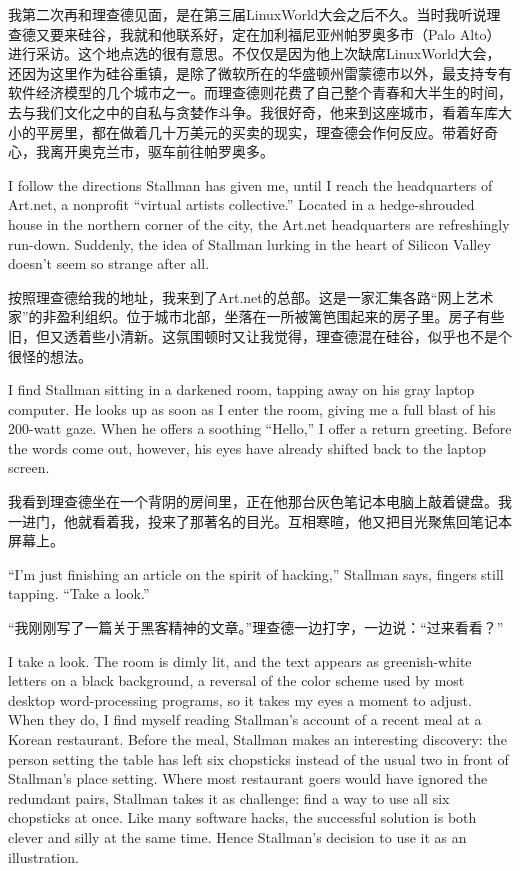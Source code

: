\ifdefined\chs
我第二次再和理查德见面，是在第三届LinuxWorld大会之后不久。当时我听说理查德又要来硅谷，我就和他联系好，定在加利福尼亚州帕罗奥多市（Palo Alto）进行采访。这个地点选的很有意思。不仅仅是因为他上次缺席LinuxWorld大会，还因为这里作为硅谷重镇，是除了微软所在的华盛顿州雷蒙德市以外，最支持专有软件经济模型的几个城市之一。而理查德则花费了自己整个青春和大半生的时间，去与我们文化之中的自私与贪婪作斗争。我很好奇，他来到这座城市，看着车库大小的平房里，都在做着几十万美元的买卖的现实，理查德会作何反应。带着好奇心，我离开奥克兰市，驱车前往帕罗奥多。
\fi

\ifdefined\eng
I follow the directions Stallman has given me, until I reach the headquarters of Art.net, a nonprofit ``virtual artists collective.'' Located in a hedge-shrouded house in the northern corner of the city, the Art.net headquarters are refreshingly run-down. Suddenly, the idea of Stallman lurking in the heart of Silicon Valley doesn't seem so strange after all.
\fi

\ifdefined\chs
按照理查德给我的地址，我来到了Art.net的总部。这是一家汇集各路“网上艺术家”的非盈利组织。位于城市北部，坐落在一所被篱笆围起来的房子里。房子有些旧，但又透着些小清新。这氛围顿时又让我觉得，理查德混在硅谷，似乎也不是个很怪的想法。
\fi

\ifdefined\eng
I find Stallman sitting in a darkened room, tapping away on his gray laptop computer. He looks up as soon as I enter the room, giving me a full blast of his 200-watt gaze. When he offers a soothing ``Hello,'' I offer a return greeting. Before the words come out, however, his eyes have already shifted back to the laptop screen.
\fi

\ifdefined\chs
我看到理查德坐在一个背阴的房间里，正在他那台灰色笔记本电脑上敲着键盘。我一进门，他就看着我，投来了那著名的目光。互相寒暄，他又把目光聚焦回笔记本屏幕上。
\fi

\ifdefined\eng
``I'm just finishing an article on the spirit of hacking,'' Stallman says, fingers still tapping. ``Take a look.''
\fi

\ifdefined\chs
“我刚刚写了一篇关于黑客精神的文章。”理查德一边打字，一边说：“过来看看？”
\fi

\ifdefined\eng
I take a look. The room is dimly lit, and the text appears as greenish-white letters on a black background, a reversal of the color scheme used by most desktop word-processing programs, so it takes my eyes a moment to adjust. When they do, I find myself reading Stallman's account of a recent meal at a Korean restaurant. Before the meal, Stallman makes an interesting discovery: the person setting the table has left six chopsticks instead of the usual two in front of Stallman's place setting. Where most restaurant goers would have ignored the redundant pairs, Stallman takes it as challenge: find a way to use all six chopsticks at once. Like many software hacks, the successful solution is both clever and silly at the same time. Hence Stallman's decision to use it as an illustration.
\fi

